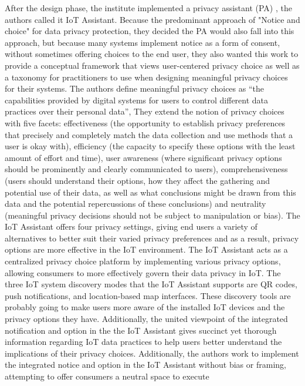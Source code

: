 \documentclass[conference]{IEEEtran}
\begin{document}
After the design phase, the institute implemented a privacy assistant (PA) \cite{FengDesign},
the authors called it IoT Assistant. Because the predominant approach of
"Notice and choice" for data privacy protection, they decided the PA would
also fall into this approach, but because many systems implement notice as
a form of consent, without sometimes offering choices to the end user, they
also wanted this work to provide a conceptual framework that views user-centered
privacy choice as well as a taxonomy for practitioners to use when designing
meaningful privacy choices for their systems. The authors define meaningful
privacy choices as ``the capabilities provided by digital systems for users
to control different data practices over their personal data'', They extend
the notion of privacy choices with five facets: effectiveness (the opportunity
to establish privacy preferences that precisely and completely match the
data collection and use methods that a user is okay with), efficiency (the
capacity to specify these options with the least amount of effort and time),
user awareness (where significant privacy options should be prominently and
clearly communicated to users), comprehensiveness (users should understand
their options, how they affect the gathering and potential use of their data,
as well as what conclusions might be drawn from this data and the potential
repercussions of these conclusions) and neutrality (meaningful privacy decisions
should not be subject to manipulation or bias). The IoT Assistant offers
four privacy settings, giving end users a variety of alternatives to better
suit their varied privacy preferences and as a result, privacy options are
more effective in the IoT environment. The IoT Assistant acts as a centralized
privacy choice platform by implementing various privacy options, allowing
consumers to more effectively govern their data privacy in IoT. The three
IoT system discovery modes that the IoT Assistant supports are QR codes,
push notifications, and location-based map interfaces. These discovery tools
are probably going to make users more aware of the installed IoT devices
and the privacy options they have. Additionally, the united viewpoint of
the integrated notification and option in the the IoT Assistant gives succinct
yet thorough information regarding IoT data practices to help users better
understand the implications of their privacy choices. Additionally, the authors
work to implement the integrated notice and option in the IoT Assistant without
bias or framing, attempting to offer consumers a neutral space to execute
\end{document}
